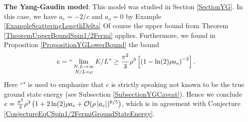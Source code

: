 \textbf{The Yang-Gaudin model}:
This model was studied in Section \ref{SectionYG}. In this case, we have $ a_e=-2/c $ and $ a_o=0 $ by Example \ref{ExampleScatteringLengthDelta} Of course the upper bound from Theorem \ref{TheoremUpperBoundSpin1/2Fermi} applies. Furthermore, we found in Proposition \ref{PropositionYGLowerBound} the bound\begin{equation}
e=``\lim\limits_{\substack{N,L\to\infty\\
N/L=\rho}}E/L"\geq \frac{\pi^2}{3}\rho^3\left[\left(1-\ln(2)\rho a_e\right)^{-2}\right].
\end{equation}
Here ``" is used to emphasize that $ e $ is strictly speaking not known to be the true ground state energy (see Subsection \ref{SubsectionYGCaveat}).
Hence we conclude $ e=\frac{\pi^2}{3}\rho^3\left(1+2\ln(2)\rho a_e+\mathcal{O}(\rho \left\lvert a_e \right\rvert)^{6/5}\right) $, which is in agreement with Conjecture \ref{ConjectureEqCSpin1/2FermiGroundStateEnergy}.

